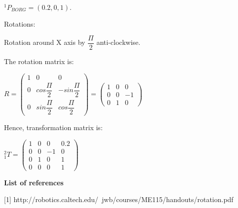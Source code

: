 \documentclass[12pt]{article}
\begin{document}
\begin{list}{)~}{}
$^1 P_{BORG} = \left(0.2, 0, 1\right)$.

Rotations:

\begin{list}{)~}{}
\item Rotation around X axis by $\dfrac{\Pi}{2}$ anti-clockwise.

\end{list}

The rotation matrix is:

$R=
\left(\begin{array}{ccc}
1 & 0 & 0\\
0 & cos \dfrac{\Pi}{2} & -sin \dfrac{\Pi}{2} \\
0 & sin \dfrac{\Pi}{2} & cos \dfrac{\Pi}{2} \end{array}\right)
=
\left(\begin{array}{ccc}
1 & 0 & 0\\
0 & 0 & -1\\
0 & 1 & 0\end{array}\right)$

Hence, transformation matrix is:

$_{1}^{2}T = \left(\begin{array}{cccc}
1 & 0 & 0 & 0.2\\
0 & 0 & -1 & 0\\
0 & 1 & 0 & 1\\
0 & 0 & 0 & 1\end{array}\right)$

\end{list}

\medskip

\textbf{List of references}

[1] http://robotics.caltech.edu/~jwb/courses/ME115/handouts/rotation.pdf
\end{document}
